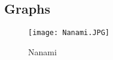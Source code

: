 	\subsection{Graphs}
		\begin{figure}[htbp]
			\centering
			\caption{Nanami}
			\texttt{[image: Nanami.JPG]}
			\label{fig: nanami}
		\end{figure}
		











